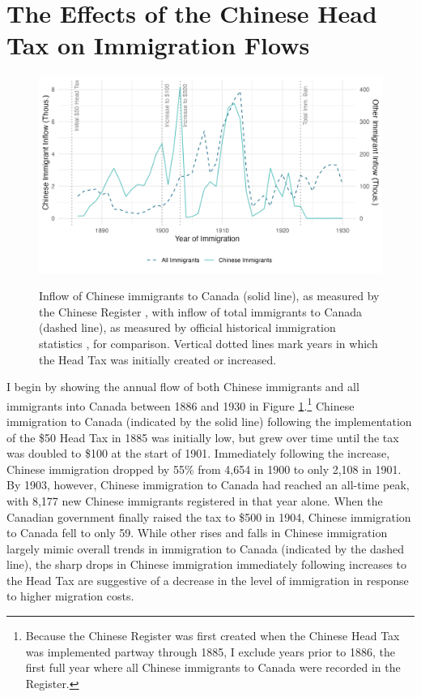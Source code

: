 
\section{The Effects of the Chinese Head Tax on Immigration Flows}

\begin{figure}[!h]
    \centering 
    \caption{Inflow of Chinese immigrants to Canada (solid line), as measured by the Chinese Register \citep{chineseregister}, with inflow of total immigrants to Canada (dashed line), as measured by official historical immigration statistics \citep{canimm}, for comparison. Vertical dotted lines mark years in which the Head Tax was initially created or increased.}
    \includegraphics[width=\textwidth]{../../figs/fig1_immflow.png}
    \label{fig:inflow}
\end{figure}

I begin by showing the annual flow of both Chinese immigrants and all immigrants into Canada between 1886 and 1930 in Figure \ref{fig:inflow}.\footnote{Because the Chinese Register was first created when the Chinese Head Tax was implemented partway through 1885, I exclude years prior to 1886, the first full year where all Chinese immigrants to Canada were recorded in the Register.}
Chinese immigration to Canada (indicated by the solid line) following the implementation of the \$50 Head Tax in 1885 was initially low, but grew over time until the tax was doubled to \$100 at the start of 1901. Immediately following the increase, Chinese immigration dropped by 55\% from 4,654 in 1900 to only 2,108 in 1901. By 1903, however, Chinese immigration to Canada had reached an all-time peak, with 8,177 new Chinese immigrants registered in that year alone. When the Canadian government finally raised the tax to \$500 in 1904, Chinese immigration to Canada fell to only 59. While other rises and falls in Chinese immigration largely mimic overall trends in immigration to Canada (indicated by the dashed line), the sharp drops in Chinese immigration immediately following increases to the Head Tax are suggestive of a decrease in the level of immigration in response to higher migration costs.

